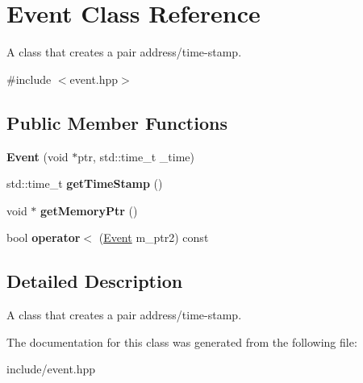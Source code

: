 \hypertarget{class_event}{}\section{Event Class Reference}
\label{class_event}


A class that creates a pair address/time-\/stamp.  




{\ttfamily \#include $<$event.\+hpp$>$}

\subsection*{Public Member Functions}
\begin{DoxyCompactItemize}
\item 
{\bfseries Event} (void $\ast$ptr, std\+::time\+\_\+t \+\_\+time)\hypertarget{class_event_a4c7bb7b8917287f04dbc38c4acdb1560}{}\label{class_event_a4c7bb7b8917287f04dbc38c4acdb1560}

\item 
std\+::time\+\_\+t {\bfseries get\+Time\+Stamp} ()\hypertarget{class_event_a10f30e1a322839fe772a6533d8681c4f}{}\label{class_event_a10f30e1a322839fe772a6533d8681c4f}

\item 
void $\ast$ {\bfseries get\+Memory\+Ptr} ()\hypertarget{class_event_ad251fb8313c6697932445d151c0fa0e2}{}\label{class_event_ad251fb8313c6697932445d151c0fa0e2}

\item 
bool {\bfseries operator$<$} (\hyperlink{class_event}{Event} m\+\_\+ptr2) const \hypertarget{class_event_afb9a087d9a508511b115cb5536160a76}{}\label{class_event_afb9a087d9a508511b115cb5536160a76}

\end{DoxyCompactItemize}


\subsection{Detailed Description}
A class that creates a pair address/time-\/stamp. 

The documentation for this class was generated from the following file\+:\begin{DoxyCompactItemize}
\item 
include/event.\+hpp\end{DoxyCompactItemize}
